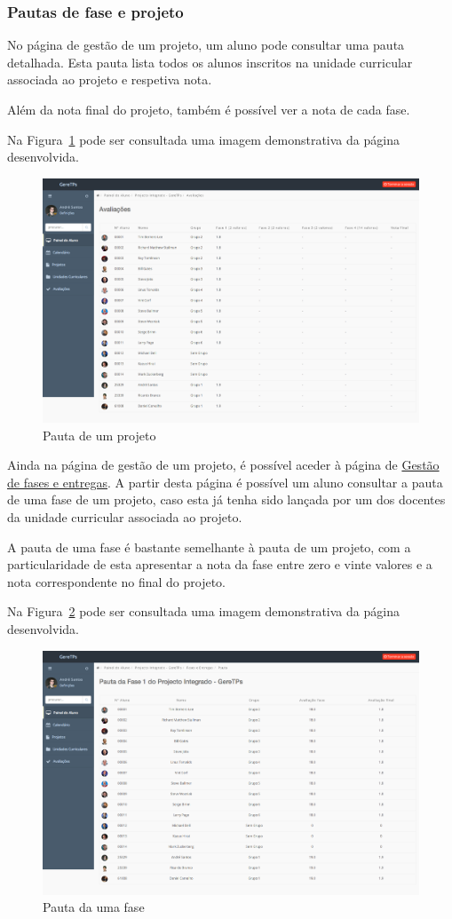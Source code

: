 \subsubsection{Pautas de fase e projeto}

No página de gestão de um projeto, um aluno pode consultar uma pauta detalhada. Esta pauta lista todos os alunos inscritos na unidade curricular associada ao projeto e respetiva nota.

Além da nota final do projeto, também é possível ver a nota de cada fase.

Na Figura~\ref{fig:student_grades_project} pode ser consultada uma imagem demonstrativa da página desenvolvida.

\begin{figure}[H]
	\centering
	\includegraphics[width=1\textwidth,center]{images/implementacao/alunos/grades_project}
	\caption{Pauta de um projeto}
	\label{fig:student_grades_project}
\end{figure}

Ainda na página de gestão de um projeto, é possível aceder à página de \hyperref[ssub:gestao_fases]{Gestão de fases e entregas}. A partir desta página é possível um aluno consultar a pauta de uma fase de um projeto, caso esta já tenha sido lançada por um dos docentes da unidade curricular associada ao projeto.

A pauta de uma fase é bastante semelhante à pauta de um projeto, com a particularidade de esta apresentar a nota da fase entre zero e vinte valores e a nota correspondente no final do projeto.

Na Figura~\ref{fig:student_grades_phase} pode ser consultada uma imagem demonstrativa da página desenvolvida.

\begin{figure}[H]
	\centering
	\includegraphics[width=1\textwidth,center]{images/implementacao/alunos/grades_phase}
	\caption{Pauta da uma fase}
	\label{fig:student_grades_phase}
\end{figure}
